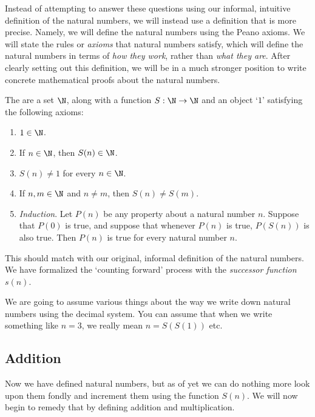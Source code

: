 \documentclass[a4paper]{scrreprt}
\begin{document}
Instead of attempting to answer these questions using our informal, intuitive definition of the natural numbers, we will instead use a definition that is more precise. Namely, we will define the natural numbers using the Peano axioms. We will state the rules or \emph{axioms} that natural numbers satisfy, which will define the natural numbers in terms of \emph{how they work}, rather than \emph{what they are}. After clearly setting out this definition, we will be in a much stronger position to write concrete mathematical proofs about the natural numbers.

\begin{definition}
	The  are a set $\N$, along with a function $S: \N \rightarrow \N$ and an object `$1$' satisfying the following axioms:
	\begin{enumerate}
		\item $1 \in \N$.
		\item If $n \in \N$, then $S(n) \in \N$.
		\item $S(n) \neq 1$ for every $n \in \N$.
		\item If $n, m \in \N$ and $n \neq m$, then $S(n) \neq S(m)$.
		\item \emph{Induction}. Let $P(n)$ be any property about a natural number $n$. Suppose that $P(0)$ is true, and suppose that whenever $P(n)$ is true, $P(S(n))$ is also true. Then $P(n)$ is true for every natural number $n$.
	\end{enumerate}
\end{definition}

This should match with our original, informal definition of the natural numbers. We have formalized the `counting forward' process with the \emph{successor function} $s(n)$.

\begin{remark}
	We are going to assume various things about the way we write down natural numbers using the decimal system. You can assume that when we write something like $n = 3$, we really mean $n = S(S(1))$ etc.
\end{remark}


\subsection{Addition}

Now we have defined natural numbers, but as of yet we can do nothing more look upon them fondly and increment them using the function $S(n)$. We will now begin to remedy that by defining addition and multiplication.
\end{document}
